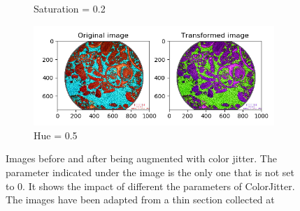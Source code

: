 \begin{itemize}
\begin{figure}
\begin{subfigure}{.5\textwidth}
  \caption{Saturation = 0.2}
  \label{fig:saturation}
\end{subfigure}%
\begin{subfigure}{.5\textwidth}
  \centering
  \includegraphics[width=.8\linewidth]{figures/03-hue05.PNG}
  \caption{Hue = 0.5}
  \label{fig:hue}
\end{subfigure}
\caption[Color Jitter Augmentation]{Images before and after being augmented with color jitter. The parameter indicated under the image is the only one that is not set to 0. It shows the impact of different the parameters of ColorJitter. The images have been adapted from a thin section collected at \cite{section}}
\label{fig:colorjitter}
\end{figure}


\end{itemize}
